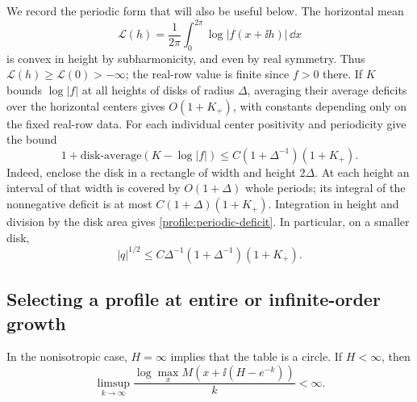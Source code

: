 We record the periodic form that will also be useful below. The
horizontal mean
\[
 \mathcal L(h)=\frac1{2\pi}\int_0^{2\pi}
                     \log|f(x+\ii h)|\,\dd x
\]
is convex in height by subharmonicity, and even by real symmetry.
Thus \(\mathcal L(h)\ge\mathcal L(0)>-\infty\); the real-row
value is finite since \(f>0\) there. If \(K\) bounds
\(\log|f|\) at all heights of disks of radius \(\Delta\),
averaging their average deficits over the horizontal centers gives
\(O(1+K_+)\), with constants depending only on the fixed real-row
data. For each individual center positivity and periodicity give
the bound
\begin{equation}
 \label{profile:periodic-deficit}
 1+\text{disk-average}(K-\log|f|)
 \le C(1+\Delta^{-1})(1+K_+).
\end{equation}
Indeed, enclose the disk in a rectangle of width and height
\(2\Delta\). At each height an interval of that width is covered
by \(O(1+\Delta)\) whole periods; its integral of the nonnegative
deficit is at most \(C(1+\Delta)(1+K_+)\). Integration in height
and division by the disk area gives
\eqref{profile:periodic-deficit}. In particular, on a smaller disk,
\begin{equation}
 \label{profile:periodic-q-bound}
 |q|^{1/2}\le C\Delta^{-1}(1+\Delta^{-1})(1+K_+).
\end{equation}

\subsection{Selecting a profile at entire or infinite-order growth}

\begin{theorem}
\label{thm:infinite-growth-exclusion}
In the nonisotropic case, \(H=\infty\) implies that the table is a
circle. If \(H<\infty\), then
\[
 \limsup_{k\to\infty}
 \frac{\log\max_x M(x+\ii(H-e^{-k}))}{k}<\infty.
\]
\end{theorem}

